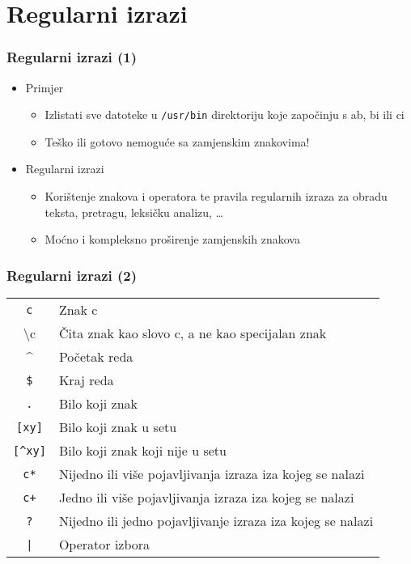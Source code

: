 \documentclass[table,usenames,dvipsnames]{beamer}
\newcommand{\shell}[1]{\texttt{#1}}
\begin{document}
\section{Regularni izrazi}
\begin{frame}[t]
\frametitle{Regularni izrazi (1)}
\begin{itemize}
  \item Primjer
  \begin{itemize}
    \item Izlistati sve datoteke u \shell{/usr/bin} direktoriju koje 
          započinju s ab, bi ili ci
    \item Teško ili gotovo nemoguće sa zamjenskim znakovima!
  \end{itemize}
  \item Regularni izrazi
  \begin{itemize}
    \item Korištenje znakova i operatora te pravila regularnih izraza za 
          obradu teksta, pretragu, leksičku analizu, \ldots
    \item Moćno i kompleksno proširenje zamjenskih znakova
  \end{itemize}
\end{itemize}
\end{frame}

\begin{frame}[t]
\frametitle{Regularni izrazi (2)}
\begin{table}[h]
\begin{tabular}{c l}
  \shell{c} & Znak c \\
  \textbackslash{}c & Čita znak kao slovo c, a ne kao specijalan znak \\
  \textasciicircum{} & Početak reda \\
  \shell{\$} & Kraj reda \\
  \shell{.} & Bilo koji znak \\
  \shell{[xy]} & Bilo koji znak u setu \\
  \shell{[\textasciicircum{}xy]} &  Bilo koji znak koji nije u setu \\
  \shell{c*} &Nijedno ili više pojavljivanja izraza iza kojeg se nalazi \\
  \shell{c+} & Jedno ili više pojavljivanja izraza iza kojeg se nalazi \\
  \shell{?} & Nijedno ili jedno pojavljivanje izraza iza kojeg se nalazi \\
  \shell{|} & Operator izbora
\end{tabular}
\end{table}
\end{frame}
  
\end{document}
